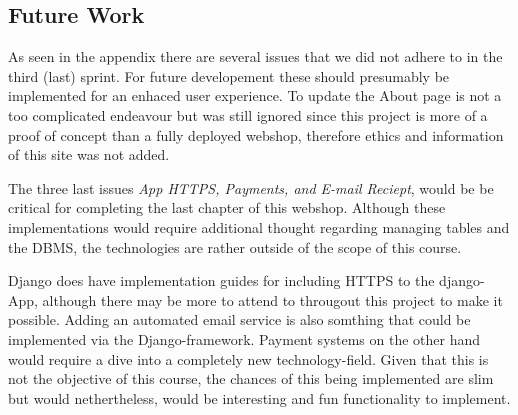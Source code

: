 \subsection{Future Work} 

As seen in the appendix there are several issues that we did not adhere to
in the third (last) sprint. For future developement these should presumably
be implemented for an enhaced user experience. To update the About page is
not a too complicated endeavour but was still ignored since this project
is more of a proof of concept than a fully deployed webshop, therefore
ethics and information of this site was not added. 

The three last issues \textit{App HTTPS, Payments, and E-mail Reciept}, would
be be critical for completing the last chapter of this webshop. Although these
implementations would require additional thought regarding managing tables
and the DBMS, the technologies are rather outside of the scope of this course.

Django does have implementation guides for including HTTPS to the django-App,
although there may be more to attend to througout this project to make it
possible. Adding an automated email service is also somthing that could be
implemented via the Django-framework.  Payment systems on the other hand
would require a dive into a completely new technology-field. Given that this
is not the objective of this course, the chances of this being implemented
are slim but would nethertheless, would be interesting and fun functionality
to implement.


